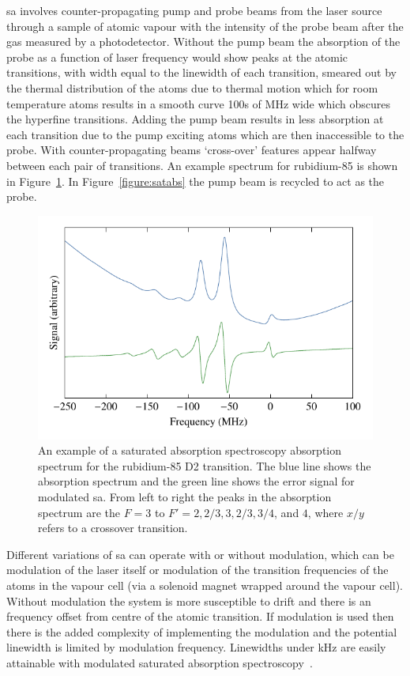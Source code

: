 \Gls{sa} involves counter-propagating pump and probe beams from the laser source through a sample of atomic vapour with the intensity of the probe beam after the gas measured by a photodetector.
Without the pump beam the absorption of the probe as a function of laser frequency would show peaks at the atomic transitions, with width equal to the linewidth of each transition, smeared out by the thermal distribution of the atoms due to thermal motion which for room temperature atoms results in a smooth curve 100s of MHz wide which obscures the hyperfine transitions.
Adding the pump beam results in less absorption at each transition due to the pump exciting atoms which are then inaccessible to the probe. With counter-propagating beams `cross-over' features appear halfway between each pair of transitions.
An example spectrum for rubidium-85 is shown in Figure~\ref{figure:satabsspectrum}.
In Figure~\ref{figure:satabs} the pump beam is recycled to act as the probe.

\begin{figure}
    \center
    \includegraphics{part1/Figs/SatAbsSpectrum.pdf}
    \caption{An example of a saturated absorption spectroscopy absorption spectrum for the rubidium-85 D2 transition.
    The blue line shows the absorption spectrum and the green line shows the error signal for modulated \gls{sa}.
    From left to right the peaks in the absorption spectrum are the $F=3$ to $F'=2,2/3,3,2/3,3/4$, and $4$, where $x/y$ refers to a crossover transition.}
    \label{figure:satabsspectrum}
\end{figure}

Different variations of \gls{sa} can operate with or without modulation, which can be modulation of the laser itself or modulation of the transition frequencies of the atoms in the vapour cell (via a solenoid magnet wrapped around the vapour cell).
Without modulation the system is more susceptible to drift and there is an frequency offset from centre of the atomic transition.
If modulation is used then there is the added complexity of implementing the modulation and the potential linewidth is limited by modulation frequency.
Linewidths under \unit[150]{kHz} are easily attainable with modulated saturated absorption spectroscopy~\cite{saliba_linewidths_2009}.


